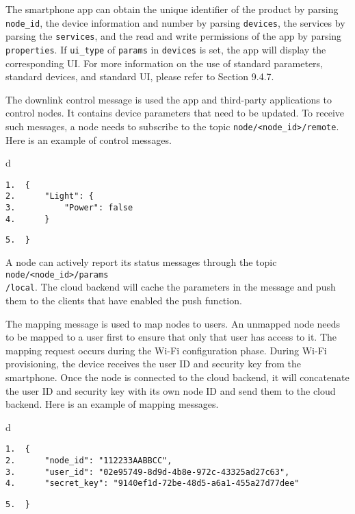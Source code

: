 \documentclass[a4paper,12pt]{book}
\begin{document}
The smartphone app can obtain the unique identifier of the product by parsing \verb|node_id|, the device information and number by parsing \verb|devices|, the services by parsing the \verb|services|, and the read and write permissions of the app by parsing \verb|properties|. If \verb|ui_type| of \verb|params| in \verb|devices| is set, the app will display the corresponding UI. For more information on the use of standard parameters, standard devices, and standard UI, please refer to Section 9.4.7.

The downlink control message is used the app and third-party applications to control nodes. It contains device parameters that need to be updated. To receive such messages, a node needs to subscribe to the topic \verb|node/<node_id>/remote|. Here is an example of control messages.

\begin{codebloc}
\begin{tabular}{d}
\vspace{2pt}
\begin{verbatim}
1.  {
2.      "Light": {
3.          "Power": false
4.      }
\end{verbatim}
\verb|5.  }|
\end{tabular}
\end{codebloc}

A node can actively report its status messages through the topic \verb|node/<node_id>/params|\\ \verb|/local|. The cloud backend will cache the parameters in the message and push them to the clients that have enabled the push function.

The mapping message is used to map nodes to users. An unmapped node needs to be mapped to a user first to ensure that only that user has access to it. The mapping request occurs during the Wi-Fi configuration phase. During Wi-Fi provisioning, the device receives the user ID and security key from the smartphone. Once the node is connected to the cloud backend, it will concatenate the user ID and security key with its own node ID and send them to the cloud backend. Here is an example of mapping messages.

\begin{codebloc}
\begin{tabular}{d}
\vspace{2pt}
\begin{verbatim}
1.  {
2.      "node_id": "112233AABBCC",
3.      "user_id": "02e95749-8d9d-4b8e-972c-43325ad27c63",
4.      "secret_key": "9140ef1d-72be-48d5-a6a1-455a27d77dee"
\end{verbatim}
\verb|5.  }|
\end{tabular}
\end{codebloc}
\end{document}
